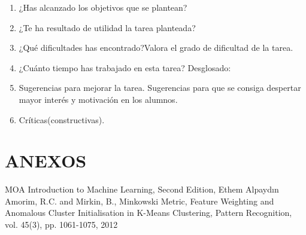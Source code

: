 \documentclass[10pt,a4paper]{article}
\begin{document}
\begin{enumerate}

	\item ¿Has alcanzado los objetivos que se plantean? 
	
	\item ¿Te ha resultado de utilidad la tarea planteada?

	\item ¿Qué dificultades has encontrado?Valora el grado de dificultad de la tarea.

	\item  ¿Cuánto tiempo has trabajado en esta tarea? Desglosado:

		\begin{table}[H]
		\centering
		\end{table}

	\item  Sugerencias para mejorar la tarea. Sugerencias para que se consiga
	despertar mayor interés y motivación en los alumnos.\par

	\item  Críticas(constructivas).

\end{enumerate} 

\newpage

\section*{ANEXOS}

\newpage



\newpage



\newpage

\begin{thebibliography}{X}
	 MOA
	 Introduction to Machine Learning, Second Edition, Ethem
	Alpaydın
	 Amorim, R.C. and Mirkin, B., Minkowski
	Metric, Feature Weighting and Anomalous Cluster Initialisation in K-Means Clustering, Pattern Recognition, vol. 45(3), pp. 1061-1075, 2012
\end{thebibliography}

\end{document}
